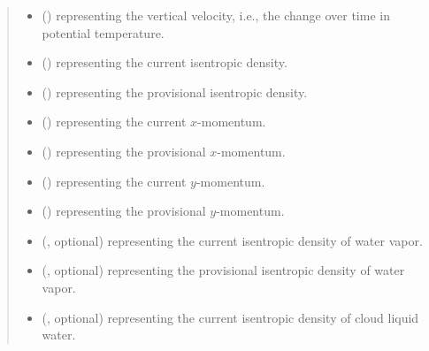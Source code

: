 \documentclass[letterpaper,10pt,english]{sphinxmanual}
\begin{document}
\begin{fulllineitems}
\begin{fulllineitems}
\begin{quote}
\begin{description}
\begin{itemize}
\item {} 
 () \textendash{}  representing the vertical velocity, i.e., the change over time in potential temperature.

\item {} 
 () \textendash{}  representing the current isentropic density.

\item {} 
 () \textendash{}  representing the provisional isentropic density.

\item {} 
 () \textendash{}  representing the current \(x\)-momentum.

\item {} 
 () \textendash{}  representing the provisional \(x\)-momentum.

\item {} 
 () \textendash{}  representing the current \(y\)-momentum.

\item {} 
 () \textendash{}  representing the provisional \(y\)-momentum.

\item {} 
 (, optional) \textendash{}  representing the current isentropic density of water vapor.

\item {} 
 (, optional) \textendash{}  representing the provisional isentropic density of water vapor.

\item {} 
 (, optional) \textendash{}  representing the current isentropic density of cloud liquid water.


\end{itemize}
\end{description}
\end{quote}
\end{fulllineitems}
\end{fulllineitems}
\end{document}
